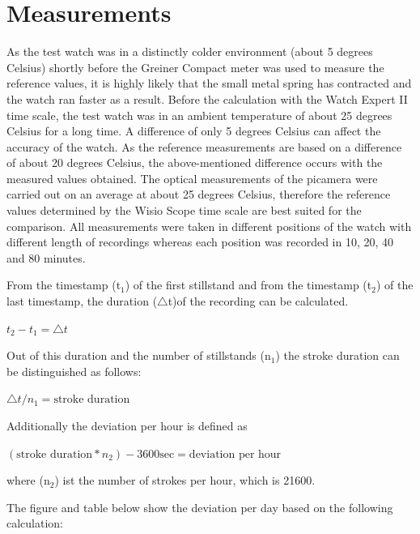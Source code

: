 \documentclass[12pt, a4paper]{report}
\begin{document}
    \section{Measurements}
As the test watch was in a distinctly colder environment (about 5 degrees Celsius) shortly before the Greiner Compact meter was used to measure the reference values, it is highly likely that the small metal spring has contracted and the watch ran faster as a result. Before the calculation with the Watch Expert II time scale, the test watch was in an ambient temperature of about 25 degrees Celsius for a long time. A difference of only 5 degrees Celsius can affect the accuracy of the watch. \cite{Witschi_basics} As the reference measurements are based on a difference of about 20 degrees Celsius, the above-mentioned difference occurs with the measured values obtained.
The optical measurements of the picamera were carried out on an average at about 25 degrees Celsius, therefore the reference values determined by the Wisio Scope time scale are best suited for the comparison.
\bigskip
\newline
    All measurements were taken in different positions of the watch with different length
    of recordings whereas each position was recorded in 10, 20, 40 and 80 minutes.
\bigskip
\newline

From the timestamp (t$_1$) of the first stillstand and from the timestamp (t$_2$) of the last timestamp, the duration ($\triangle$t)of the recording can be calculated.
    \bigskip
    \begin{center}
    \(t_2-t_1 = \triangle t\)
    \end{center}
     \bigskip
    
Out of this duration and the number of stillstands (n$_1$) the stroke duration can be distinguished as follows:
    \bigskip
        \begin{center}
	\( \triangle t / n_1 = \text{stroke duration}\)
	    \end{center}
	\bigskip

Additionally the deviation per hour is defined as 
  \bigskip
        \begin{center}
    \((\text{stroke duration}*n_2)-3600 \text{sec}=\text{deviation per hour}\)
        
    \end{center}
        \bigskip
where (n$_2$) ist the number of strokes per hour, which is 21600.

    The figure and table below show the deviation per day based on the following calculation:
\end{document}
